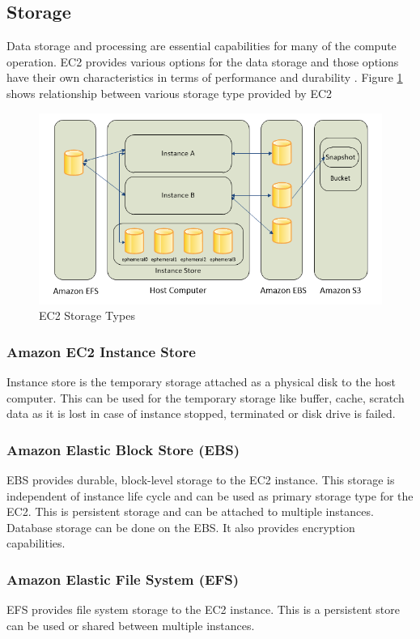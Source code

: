 \subsection{Storage}
Data storage and processing are essential capabilities for many of the compute operation. EC2 provides various options for the data storage and those options have their own characteristics in terms of performance and durability \cite{www-aws-ec2Storage}. Figure \ref{f:ec2-storage} shows relationship between various storage type provided by EC2
\begin{figure}[!ht]
  \centering\includegraphics[width=\columnwidth]{images/ec2Storage.PNG}
  \caption{EC2 Storage Types \cite{www-aws-ec2Storage}}\label{f:ec2-storage}
\end{figure}

\subsubsection{Amazon EC2 Instance Store} \cite{www-aws-ec2Storage}
Instance store is the temporary storage attached as a physical disk to the host computer. This can be used for the temporary storage like buffer, cache, scratch data as it is lost in case of instance stopped, terminated or disk drive is failed.
\subsubsection{Amazon Elastic Block Store (EBS)} \cite{www-aws-ec2Storage}
EBS provides durable, block-level storage to the EC2 instance. This storage is independent of instance life cycle and can be used as primary storage type for the EC2. This is persistent storage and can be attached to multiple instances. Database storage can be done on the EBS. It also provides encryption capabilities.
\subsubsection{Amazon Elastic File System (EFS)} \cite{www-aws-ec2Storage}
EFS provides file system storage to the EC2 instance. This is a persistent store can be used or shared between multiple instances.

